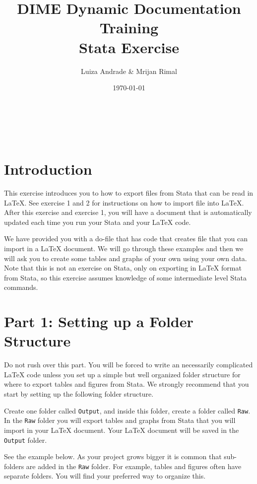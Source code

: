 \documentclass[]{article}
\title{DIME Dynamic Documentation Training \\ Stata Exercise}
\author{Luiza Andrade \& Mrijan Rimal}
\date{\today}
\begin{document}
\makeatletter
\begin{titlepage}
	\begin{center}
		{\LARGE \bfseries  \@title }\\[2ex] 
		{\Large  \@author}\\[20ex] 
		{\large \@date}
	\end{center}
\end{titlepage}
\makeatother

\section*{Introduction}
This exercise introduces you to how to export files from Stata that can be read in {\LaTeX}. See exercise 1 and 2 for instructions on how to import file into {\LaTeX}. After this exercise and exercise 1, you will have a document that is automatically updated each time you run your Stata and your {\LaTeX} code.

We have provided you with a do-file that has code that creates file that you can import in a {\LaTeX} document. We will go through these examples and then we will ask you to create some tables and graphs of your own using your own data. Note that this is not an exercise on Stata, only on exporting in {\LaTeX} format from Stata, so this exercise assumes knowledge of some intermediate level Stata commands.

\section*{Part 1: Setting up a Folder Structure}
Do not rush over this part. You will be forced to write an necessarily complicated {\LaTeX} code unless you set up a simple but well organized folder structure for where to export tables and figures from Stata. We strongly recommend that you start by setting up the following folder structure. 

Create one folder called \texttt{Output}, and inside this folder, create a folder called \texttt{Raw}. In the \texttt{Raw} folder you will export tables and graphs from Stata that you will import in your {\LaTeX} document. Your {\LaTeX} document will be saved in the \texttt{Output} folder.

See the example below. As your project grows bigger it is common that sub-folders are added in the \texttt{Raw} folder. For example, tables and figures often have separate folders. You will find your preferred way to organize this.
\end{document}
